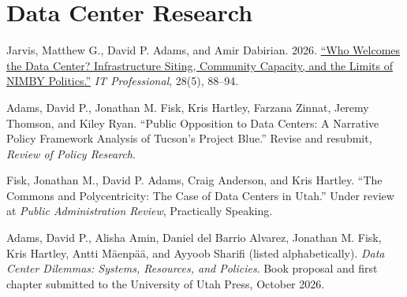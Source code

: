 \documentclass[12pt,letterpaper]{article}
\renewenvironment{itemize}{
  \begin{list}{}{
    \setlength{\leftmargin}{1.5em}
    \setlength{\itemsep}{0pt}\setlength{\topsep}{0pt}
    \setlength{\parskip}{0pt}
    \setlength{\parsep}{0.08em}
  }
}{
  \end{list}
}
\begin{document}
\section*{Data Center Research}
\begin{itemize}\leftmargin=2pt\itemindent=-15pt
  \item Jarvis, Matthew G., David P. Adams, and Amir Dabirian. 2026. \href{https://doi.org/10.1109/MITP.2026.3732817}{``Who Welcomes the Data Center? Infrastructure Siting, Community Capacity, and the Limits of NIMBY Politics.''} \emph{IT Professional}, 28(5), 88--94.
  \item Adams, David P., Jonathan M. Fisk, Kris Hartley, Farzana Zinnat, Jeremy Thomson, and Kiley Ryan. ``Public Opposition to Data Centers: A Narrative Policy Framework Analysis of Tucson's Project Blue.'' Revise and resubmit, \emph{Review of Policy Research}.
  \item Fisk, Jonathan M., David P. Adams, Craig Anderson, and Kris Hartley. ``The Commons and Polycentricity: The Case of Data Centers in Utah.'' Under review at \emph{Public Administration Review}, Practically Speaking.
  \item Adams, David P., Alisha Amin, Daniel del Barrio Alvarez, Jonathan M. Fisk, Kris Hartley, Antti Mäenpää, and Ayyoob Sharifi (listed alphabetically). \emph{Data Center Dilemmas: Systems, Resources, and Policies}. Book proposal and first chapter submitted to the University of Utah Press, October 2026.
\end{itemize}
\end{document}
